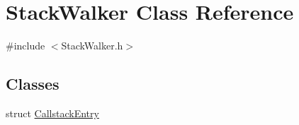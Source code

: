 \hypertarget{class_stack_walker}{\section{Stack\-Walker Class Reference}
\label{class_stack_walker}
}


{\ttfamily \#include $<$Stack\-Walker.\-h$>$}

\subsection*{Classes}
\begin{DoxyCompactItemize}
\item 
struct \hyperlink{struct_stack_walker_1_1_callstack_entry}{Callstack\-Entry}
\end{DoxyCompactItemize}
